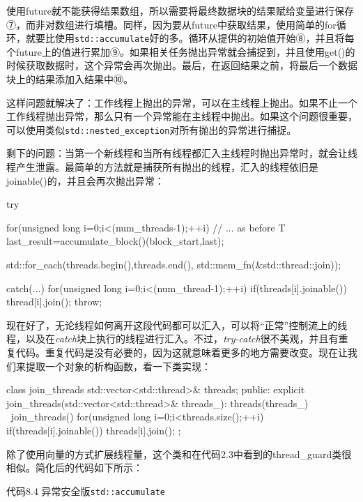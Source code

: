 使用future就不能获得结果数组，所以需要将最终数据块的结果赋给变量进行保存⑦，而非对数组进行填槽。同样，因为要从future中获取结果，使用简单的for循环，就要比使用\texttt{std::accumulate}好的多。循环从提供的初始值开始⑧，并且将每个future上的值进行累加⑨。如果相关任务抛出异常就会捕捉到，并且使用get()的时候获取数据时，这个异常会再次抛出。最后，在返回结果之前，将最后一个数据块上的结果添加入结果中⑩。

这样问题就解决了：工作线程上抛出的异常，可以在主线程上抛出。如果不止一个工作线程抛出异常，那么只有一个异常能在主线程中抛出。如果这个问题很重要，可以使用类似\texttt{std::nested\_exception}对所有抛出的异常进行捕捉。

剩下的问题：当第一个新线程和当所有线程都汇入主线程时抛出异常时，就会让线程产生泄露。最简单的方法就是捕获所有抛出的线程，汇入的线程依旧是joinable()的，并且会再次抛出异常：

\begin{cpp}
try
{
  for(unsigned long i=0;i<(num_threads-1);++i)
  {
    // ... as before
  }
  T last_result=accumulate_block()(block_start,last);

  std::for_each(threads.begin(),threads.end(),
  std::mem_fn(&std::thread::join));
}
catch(...)
{
  for(unsigned long i=0;i<(num_thread-1);++i)
  {
  if(threads[i].joinable())
    thread[i].join();
  }
  throw;
}
\end{cpp}

现在好了，无论线程如何离开这段代码都可以汇入，可以将“正常”控制流上的线程，以及在\textit{catch}块上执行的线程进行汇入。不过，\textit{try-catch}很不美观，并且有重复代码。重复代码是没有必要的，因为这就意味着更多的地方需要改变。现在让我们来提取一个对象的析构函数，看一下类实现：

\begin{cpp}
class join_threads
{
  std::vector<std::thread>& threads;
public:
  explicit join_threads(std::vector<std::thread>& threads_):
    threads(threads_)
  {}
  ~join_threads()
  {
    for(unsigned long i=0;i<threads.size();++i)
    {
      if(threads[i].joinable())
        threads[i].join();
    }
  }
};
\end{cpp}

除了使用向量的方式扩展线程量，这个类和在代码2.3中看到的thread\_guard类很相似。简化后的代码如下所示：

代码8.4 异常安全版\texttt{std::accumulate}

